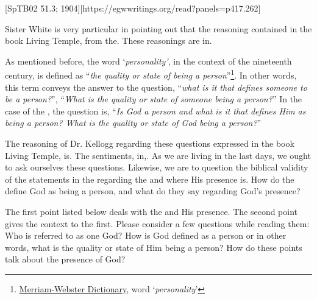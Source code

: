 [SpTB02 51.3; 1904][https://egwwritings.org/read?panels=p417.262]

Sister White is very particular in pointing out that the reasoning contained in the book Living Temple, from the. These reasonings are in.

As mentioned before, the word ‘\textit{personality’}, in the context of the nineteenth century, is defined as “\textit{the quality or state of being a person}”\footnote{\href{https://www.merriam-webster.com/dictionary/personality}{Merriam-Webster Dictionary}, word ‘\textit{personality}’}. In other words, this term conveys the answer to the question, “\textit{what is it that defines someone to be a person?}”, “\textit{What is the quality or state of someone being a person?}” In the case of the , the question is, “\textit{Is God a person and what is it that defines Him as being a person? What is the quality or state of God being a person?}”

The reasoning of Dr. Kellogg regarding these questions expressed in the book Living Temple, is. The sentiments, in,. As we are living in the last days, we ought to ask ourselves these questions. Likewise, we are to question the biblical validity of the statements in the  regarding the  and where His presence is. How do the  define God as being a person, and what do they say regarding God’s presence?

The first point listed below deals with the  and His presence. The second point gives the context to the first. Please consider a few questions while reading them: Who is referred to as one God? How is God defined as a person or in other words, what is the quality or state of Him being a person? How do these points talk about the presence of God?

